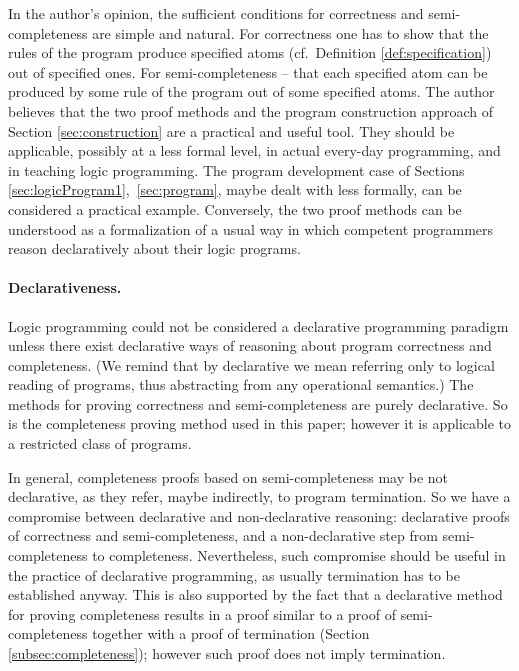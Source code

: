 \documentclass{tlp}
\begin{document}
{In the author's opinion,
the sufficient conditions for correctness and semi{-}com\-pleteness
are simple and natural.  
For correctness one has to show that the rules of
the program produce specified atoms (cf.\ Definition \ref{def:specification})
 out of specified ones.
For semi-completeness -- that each specified atom can be produced by some rule of
the program out of some specified atoms.
The author believes
  that the two proof methods
  and the program construction approach of Section \ref{sec:construction}
  are a practical and useful tool.  They should be applicable,
  possibly at a less formal level, in actual every-day programming, 
   and in teaching logic programming.
The program development case of Sections
\ref{sec:logicProgram1},~\ref{sec:program},
maybe dealt with less formally, can be considered a practical example.
Conversely,
the two proof methods can be understood as a formalization of a usual way in
which competent programmers reason declaratively about their logic programs.





\paragraph{Declarativeness.}
Logic programming could not be considered a declarative programming paradigm
unless there exist
declarative ways of reasoning about program correctness
and completeness.
(We remind that by declarative we mean referring only to logical reading of 
programs, thus abstracting from any operational semantics.)
The methods for proving correctness and semi-completeness
are purely declarative.  
So is the completeness proving method used in this paper; however it is 
applicable to a restricted class of programs.



In general, completeness proofs based on semi-completeness
 may be not declarative, as 
they refer, maybe indirectly, to program termination.
So we have a compromise between declarative and non-declarative reasoning:
declarative proofs of correctness and semi-completeness, and a
non-declarative step from semi-completeness to completeness.
Nevertheless, such compromise 
should be useful in the practice of declarative programming,
as usually termination has to be established anyway.
This is also supported by the fact that
a declarative method for proving completeness \cite{Deransart.Maluszynski93}
results in a proof similar to a proof of semi-completeness together with a
proof of termination (Section \ref{subsec:completeness});
however such proof does not imply termination.




}
\end{document}
